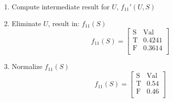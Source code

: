 \documentclass{article}
\newcommand{\mat}[1]{\begin{bmatrix}#1\end{bmatrix}}
\begin{document}
\begin{enumerate}[label=\arabic*.]
{\begin{enumerate}[label=\arabic*.]
\[{                }
            \]
            \item Compute intermediate result for $U$, $f_{11}'(U,S)$
            \item Eliminate $U$, result in: $f_{11}(S)$
            \[
                f_{11}(S) = \mat{
                    \text{S} & \text{Val} \\
                    \text{T} & 0.4241 \\
                    \text{F} & 0.3614 \\
                }
            \]
            \item Normalize $f_{11}(S)$
            \[
                f_{11}(S) = \mat{
                    \text{S} & \text{Val} \\
                    \text{T} & 0.54 \\
                    \text{F} & 0.46 \\
                }
            \]
        \end{enumerate}
    }
\end{enumerate}
\end{document}
